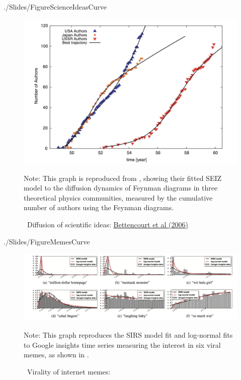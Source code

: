 \newpage


\begin{verbatimwrite}{./Slides/FigureScienceIdeasCurve}
\begin{figure}[!ht] \centering  %
	\caption{ ~Diffusion of scientific ideas: \href{http://web.mit.edu/dikaiser/www/BAKC.PhysA.pdf}{Bettencourt et al (2006)}}\nocite{bettencourt2006power}
	\label{fig:science_ideas_curve}
	\centerline{\includegraphics[width=\textwidth]{./figures/Feynman.png}}
		\begin{flushleft}{\footnotesize Note: This graph is reproduced from \cite{bettencourt2006power}, showing their fitted SEIZ model to the diffusion dynamics of Feynman diagrams in three theoretical physics communities, measured by the cumulative number of authors using the Feynman diagrams.}
	\end{flushleft}
\end{figure}
\end{verbatimwrite}%


\newpage

\begin{verbatimwrite}{./Slides/FigureMemesCurve}
\begin{figure}[!ht] \centering  %
	\caption{ ~Virality of internet memes: \href{https://github.com/iworld1991/EpiExp/blob/master/Literature/bauckhage2011insights.pdf}{\cite{bauckhage2011insights}}}
	\label{fig:memes_curve}
	\centerline{\includegraphics[width=\textwidth]{./figures/Memes.png}}
	\begin{flushleft}{\footnotesize Note: This graph reproduces the SIRS model fit and log-normal fits to Google insights time series measuring the interest in six viral memes, as shown in  \cite{bauckhage2011insights}. }
\end{flushleft}
\end{figure}
\end{verbatimwrite}%

